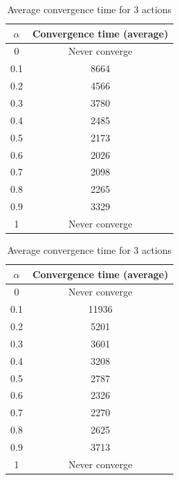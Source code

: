 \documentclass{article}
\begin{document}
\vspace{3cm}

\begin{table}[H]
\begin{minipage}{.5\linewidth}
\centering
\begin{tabular}{|c|c|} 
 \hline
  $\alpha$ & Convergence time (average) \\
  \hline
  0 & Never converge \\
  0.1 & 8664 \\
  0.2 & 4566 \\
  0.3 & 3780 \\
  0.4 & 2485 \\
  0.5 & 2173 \\
  0.6 & 2026 \\
  0.7 & 2098 \\
  0.8 & 2265 \\
  0.9 & 3329 \\
  1 & Never converge \\
  \hline
\end{tabular}
\caption{Average convergence time for 2 actions} \label{tab:convergence-alpha-2}
\end{minipage}
\begin{minipage}{.5\linewidth}
\centering
\begin{tabular}{|c|c|} 
 \hline
  $\alpha$ & Convergence time (average) \\
  \hline
  0 & Never converge \\
  0.1 & 11936 \\
  0.2 & 5201 \\
  0.3 & 3601 \\
  0.4 & 3208 \\
  0.5 & 2787 \\
  0.6 & 2326 \\
  0.7 & 2270 \\
  0.8 & 2625 \\
  0.9 & 3713 \\
  1 & Never converge \\
  \hline
\end{tabular}
\caption{Average convergence time for 3 actions} \label{tab:convergence-alpha-3}
\end{minipage}
\end{table}
\end{document}
